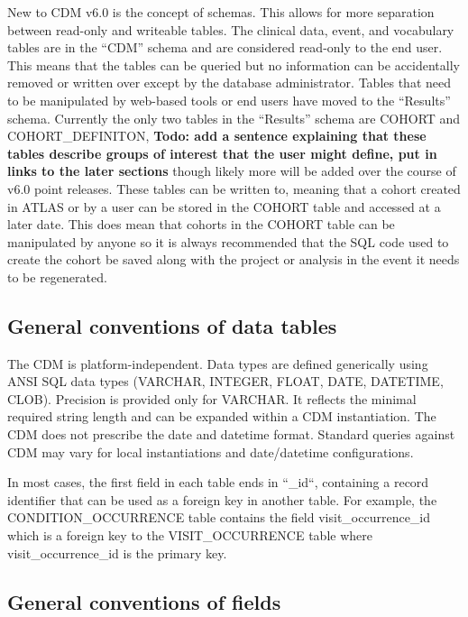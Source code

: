 \documentclass[11pt]{book}
\begin{document}
New to CDM v6.0 is the concept of schemas. This allows for more
separation between read-only and writeable tables. The clinical data,
event, and vocabulary tables are in the ``CDM'' schema and are
considered read-only to the end user. This means that the tables can be
queried but no information can be accidentally removed or written over
except by the database administrator. Tables that need to be manipulated
by web-based tools or end users have moved to the ``Results'' schema.
Currently the only two tables in the ``Results'' schema are COHORT and
COHORT\_DEFINITON, \textbf{Todo: add a sentence explaining that these
tables describe groups of interest that the user might define, put in
links to the later sections} though likely more will be added over the
course of v6.0 point releases. These tables can be written to, meaning
that a cohort created in ATLAS or by a user can be stored in the COHORT
table and accessed at a later date. This does mean that cohorts in the
COHORT table can be manipulated by anyone so it is always recommended
that the SQL code used to create the cohort be saved along with the
project or analysis in the event it needs to be regenerated.

\subsection{General conventions of data
tables}\label{general-conventions-of-data-tables}

The CDM is platform-independent. Data types are defined generically
using ANSI SQL data types (VARCHAR, INTEGER, FLOAT, DATE, DATETIME,
CLOB). Precision is provided only for VARCHAR. It reflects the minimal
required string length and can be expanded within a CDM instantiation.
The CDM does not prescribe the date and datetime format. Standard
queries against CDM may vary for local instantiations and date/datetime
configurations.

In most cases, the first field in each table ends in ``\_id``,
containing a record identifier that can be used as a foreign key in
another table. For example, the CONDITION\_OCCURRENCE table contains the
field visit\_occurrence\_id which is a foreign key to the
VISIT\_OCCURRENCE table where visit\_occurrence\_id is the primary key.

\subsection{General conventions of
fields}\label{general-conventions-of-fields}
\end{document}
